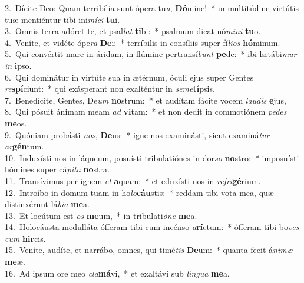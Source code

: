 {2.~}Dícite Deo: Quam terribília sunt ópera tu\textit{a}, \textbf{Dó}mine!~* in multitúdine virtútis tuæ mentiéntur tibi ini\textit{mí}\textit{ci} \textbf{tu}i.\\
{3.~}Omnis terra adóret te, et psal\textit{lat} \textbf{ti}bi:~* psalmum dicat nó\textit{mi}\textit{ni} \textbf{tu}o.\\
{4.~}Veníte, et vidéte ópe\textit{ra} \textbf{De}i:~* terríbilis in consíliis super fí\textit{li}\textit{os} \textbf{hó}minum.\\
{5.~}Qui convértit mare in áridam, in flúmine pertransí\textit{bunt} \textbf{pe}de:~* ibi lætábi\textit{mur} \textit{in} \textbf{i}pso.\\
{6.~}Qui dominátur in virtúte sua in ætérnum, óculi ejus super Gentes \textit{re}\textbf{spí}ciunt:~* qui exásperant non exalténtur in \textit{se}\textit{me}\textbf{tí}psis.\\
{7.~}Benedícite, Gentes, De\textit{um} \textbf{no}strum:~* et audítam fácite vocem \textit{lau}\textit{dis} \textbf{e}jus,\\
{8.~}Qui pósuit ánimam meam \textit{ad} \textbf{vi}tam:~* et non dedit in commotiónem \textit{pe}\textit{des} \textbf{me}os.\\
{9.~}Quóniam probásti \textit{nos}, \textbf{De}us:~* igne nos examinásti, sicut examiná\textit{tur} \textit{ar}\textbf{gén}tum.\\
{10.~}Induxísti nos in láqueum, posuísti tribulatiónes in dor\textit{so} \textbf{no}stro:~* imposuísti hómines super cá\textit{pi}\textit{ta} \textbf{no}stra.\\
{11.~}Transívimus per ignem \textit{et} \textbf{a}quam:~* et eduxísti nos in \textit{re}\textit{fri}\textbf{gé}rium.\\
{12.~}Introíbo in domum tuam in ho\textit{lo}\textbf{cáu}stis:~* reddam tibi vota mea, quæ distinxérunt lá\textit{bi}\textit{a} \textbf{me}a.\\
{13.~}Et locútum est \textit{os} \textbf{me}um,~* in tribulati\textit{ó}\textit{ne} \textbf{me}a.\\
{14.~}Holocáusta medulláta ófferam tibi cum incénso \textit{a}\textbf{rí}etum:~* ófferam tibi bo\textit{ves} \textit{cum} \textbf{hir}cis.\\
{15.~}Veníte, audíte, et narrábo, omnes, qui timé\textit{tis} \textbf{De}um:~* quanta fecit á\textit{ni}\textit{mæ} \textbf{me}æ.\\
{16.~}Ad ipsum ore meo \textit{cla}\textbf{má}vi,~* et exaltávi sub \textit{lin}\textit{gua} \textbf{me}a.\\
